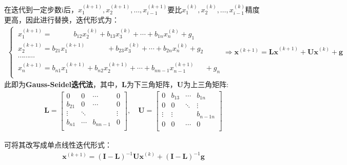 在迭代到一定步数i后，$x_1^{(k+1)},x_2^{(k+1)},\dots,x_{i-1}^{(k+1)}$要比$x_1^{(k)},x_2^{(k)},\dots,x_{i-1}^{(k)}$精度更高，因此进行替换，迭代形式为：
\begin{align}
    \begin{cases}
        \ x_1^{(k+1)} = \qquad \quad b_{12}x_2^{(k)} + b_{13}x_3^{(k)} + \cdots + b_{1n}x_n^{(k)} + g_1 \\
        \ x_2^{(k+1)} = b_{21}x_1^{(k+1)} \qquad \quad + b_{23}x_3^{(k)} + \cdots + b_{2n}x_n^{(k)} + g_2 \\
        \ \cdots \cdots \cdots \\
        \ x_n^{(k+1)} = b_{n1}x_1^{(k+1)}  + b_{n2}x_2^{(k+1)} + \cdots + b_{nn-1}x_{n-1}^{(k+1)} \quad \ \  + g_n \\
    \end{cases} \Rightarrow \boldsymbol{x}^{(k+1)} = \boldsymbol{Lx}^{(k+1)} + \boldsymbol{Ux}^{(k)} + \boldsymbol{g}
\end{align}
此即为\textbf{Gauss-Seidel迭代法}，其中，$\boldsymbol{L}$为下三角矩阵，$\boldsymbol{U}$为上三角矩阵:
\begin{align*}
    \boldsymbol{L}=\begin{bmatrix}
        0      & 0       & \cdots   & 0      \\
        b_{21} & 0       & \cdots   & 0      \\
        \vdots & \ddots  & \        & \vdots \\
        b_{n1} & \cdots  & b_{nn-1} & 0      \\
    \end{bmatrix},\quad 
    \boldsymbol{U}=\begin{bmatrix}
        0      & b_{13}  & \cdots & b_{1n}   \\
        0      & 0       & \ddots & \vdots   \\
        \vdots & \vdots  & \      & b_{n-1n} \\
        0      & 0       & \cdots & 0        \\
    \end{bmatrix}
\end{align*}

可将其改写成单点线性迭代形式：
\begin{align}
    \boldsymbol{x}^{(k+1)} = (\boldsymbol{I}-\boldsymbol{L})^{-1}\boldsymbol{Ux}^{(k)} + (\boldsymbol{I}-\boldsymbol{L})^{-1}\boldsymbol{g}
\end{align}

